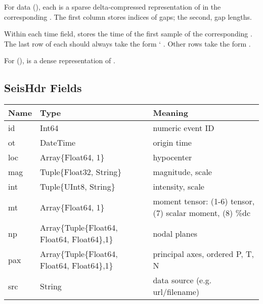 \documentclass[letterpaper,11pt,english]{sphinxmanual}
\begin{document}
For  data (), each  is a sparse
delta-compressed representation of  in the corresponding .
The first column stores indices of gaps; the second, gap lengths.

Within each time field,  stores the time of the first sample of the
corresponding . The last row of each  should always take the form {}`
. Other rows take the form .

For  (),  is a dense
representation of .


\subsection{SeisHdr Fields}
\label{\detokenize{src/Appendices/seisdata_fields:seishdr-fields}}

\begin{savenotes}\sphinxattablestart
\centering
\begin{tabulary}{\linewidth}[t]{|T|T|T|}
\hline
\sphinxstyletheadfamily 
Name
&\sphinxstyletheadfamily 
Type
&\sphinxstyletheadfamily 
Meaning
\\
\hline
id
&
Int64
&
numeric event ID
\\
\hline
ot
&
DateTime
&
origin time
\\
\hline
loc
&
Array\{Float64, 1\}
&
hypocenter
\\
\hline
mag
&
Tuple\{Float32, String\}
&
magnitude, scale
\\
\hline
int
&
Tuple\{UInt8, String\}
&
intensity, scale
\\
\hline
mt
&
Array\{Float64, 1\}
&
moment tensor: (1-6) tensor,
(7) scalar moment, (8) \%dc
\\
\hline
np
&
Array\{Tuple\{Float64,
Float64, Float64\},1\}
&
nodal planes
\\
\hline
pax
&
Array\{Tuple\{Float64,
Float64, Float64\},1\}
&
principal axes, ordered P, T, N
\\
\hline
src
&
String
&
data source (e.g. url/filename)
\\
\hline
\end{tabulary}
\par
\sphinxattableend\end{savenotes}
\end{document}
